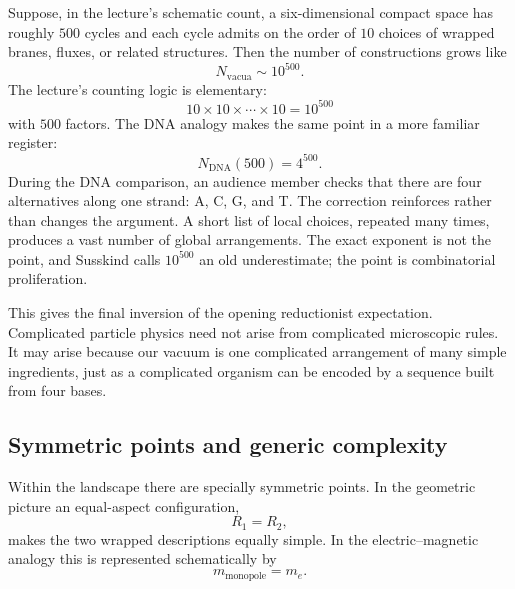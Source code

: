 Suppose, in the lecture's schematic count, a six-dimensional compact space has roughly \(500\) cycles and each cycle admits on the order of \(10\) choices of wrapped branes, fluxes, or related structures. Then the number of constructions grows like
\begin{equation}
N_{\mathrm{vacua}} \sim 10^{500}.
\end{equation}
The lecture's counting logic is elementary:
\begin{equation}
10 \times 10 \times \cdots \times 10 = 10^{500}
\end{equation}
with \(500\) factors. The DNA analogy makes the same point in a more familiar register:
\begin{equation}
N_{\mathrm{DNA}}(500)=4^{500}.
\end{equation}
During the DNA comparison, an audience member checks that there are four alternatives along one strand: A, C, G, and T. The correction reinforces rather than changes the argument. A short list of local choices, repeated many times, produces a vast number of global arrangements. The exact exponent is not the point, and Susskind calls \(10^{500}\) an old underestimate; the point is combinatorial proliferation.

This gives the final inversion of the opening reductionist expectation. Complicated particle physics need not arise from complicated microscopic rules. It may arise because our vacuum is one complicated arrangement of many simple ingredients, just as a complicated organism can be encoded by a sequence built from four bases.

\begin{classroomqa}
\end{classroomqa}

\subsection{Symmetric points and generic complexity}

Within the landscape there are specially symmetric points. In the geometric picture an equal-aspect configuration,
\begin{equation}
R_1=R_2,
\end{equation}
makes the two wrapped descriptions equally simple. In the electric--magnetic analogy this is represented schematically by
\begin{equation}
m_{\mathrm{monopole}}=m_e.
\end{equation}

